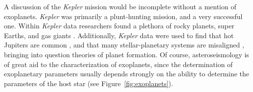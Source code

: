 A discussion of the \emph{Kepler} mission would be incomplete without a mention of exoplanets. 
\emph{Kepler} was primarily a plunt-hunting mission, and a very successful one. 
Within \emph{Kepler} data researchers found a plethora of rocky planets, super Earths, and gas giants \citep[e.g.,][]{2008ApJ...680.1450P, 2011ApJ...729...27B, 2012ApJ...745..120B, 2014ApJS..210...20M}. 
Additionally, \emph{Kepler} data were used to find that hot Jupiters are common \citep{2008ApJ...680.1450P}, and that many stellar-planetary systems are misaligned \citep{2013Sci...342..331H}, bringing into question theories of planet formation. 
Of course, asteroseismology is of great aid to the characterization of exoplanets, since the determination of exoplanetary parameters usually depends strongly on the ability to determine the parameters of the host star (see Figure~\ref{fig:exoplanets}). 

